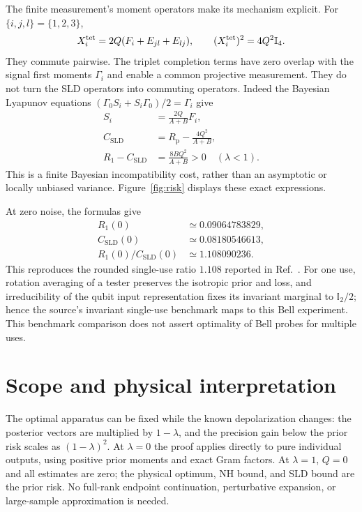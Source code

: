 \documentclass[aps,pra,reprint,amsmath,amssymb,nofootinbib,longbibliography,floatfix]{revtex4-2}
\newcommand{\I}{\mathbb{I}}
\begin{document}
The finite measurement's moment operators make its mechanism explicit.
For $\{i,j,l\}=\{1,2,3\}$,
\begin{equation}
 X_i^{\rm tet}=2Q(F_i+E_{jl}+E_{lj}),\qquad
 (X_i^{\rm tet})^2=4Q^2\I_4.
 \label{eq:completion}
\end{equation}
They commute pairwise. The triplet completion terms have zero overlap
with the signal first moments $\Gamma_i$ and enable a common projective
measurement. They do not turn the SLD operators into commuting operators.
Indeed the Bayesian Lyapunov equations
$(\Gamma_0S_i+S_i\Gamma_0)/2=\Gamma_i$ give
\begin{align}
 S_i&=\frac{2Q}{A+B}F_i,\nonumber\\
 C_{\mathrm{SLD}}&=R_{\mathrm p}-\frac{4Q^2}{A+B},\nonumber\\
 R_1-C_{\mathrm{SLD}}&=\frac{8BQ^2}{A+B}>0\quad(\lambda<1).
 \label{eq:sld}
\end{align}
This is a finite Bayesian incompatibility cost, rather than an asymptotic
or locally unbiased variance. Figure~\ref{fig:risk} displays these exact
expressions.



At zero noise, the formulas give
\begin{align}
 R_1(0)&\simeq0.09064783829,\nonumber\\
 C_{\mathrm{SLD}}(0)&\simeq0.08180546613,\nonumber\\
 R_1(0)/C_{\mathrm{SLD}}(0)&\simeq1.108090236.\label{eq:benchmark}
\end{align}
This reproduces the rounded single-use ratio $1.108$ reported in
Ref.~\cite{Bia2026}. For one use, rotation averaging of a tester preserves
the isotropic prior and loss, and irreducibility of the qubit input
representation fixes its invariant marginal to $\I_2/2$; hence the
source's invariant single-use benchmark maps to this Bell experiment.
This benchmark comparison does not assert optimality of Bell probes
for multiple uses.

\section{Scope and physical interpretation}
The optimal apparatus can be fixed while the known depolarization changes:
the posterior vectors are multiplied by $1-\lambda$, and the precision
gain below the prior risk scales as $(1-\lambda)^2$. At $\lambda=0$ the
proof applies directly to pure individual outputs, using positive prior
moments and exact Gram factors. At $\lambda=1$, $Q=0$ and all estimates
are zero; the physical optimum, NH bound, and SLD bound are the prior
risk. No full-rank endpoint continuation, perturbative expansion, or
large-sample approximation is needed.
\end{document}
